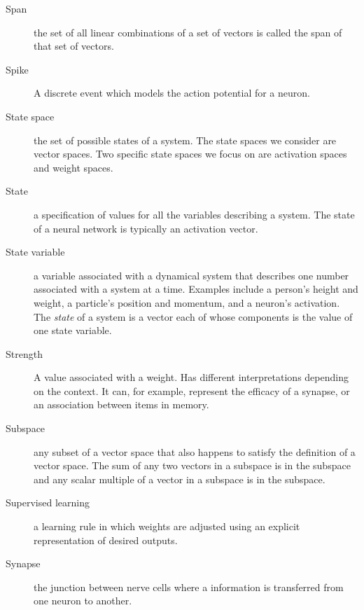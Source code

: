 \begin{description}
\item[Span] the set of all linear combinations of a set of vectors is called the span of that set of vectors.

\item[Spike] A discrete event which models the action potential for a neuron.

\item[State space] the set of possible states of a system. The state spaces we consider are vector spaces. Two specific state spaces we focus on are activation spaces and weight spaces.

\item[State] a specification of values for all the variables describing a system. The state of a neural network is typically an activation vector.

\item[State variable] a variable associated with a dynamical system that describes one number associated with a system at a time. Examples include a person's height and weight, a particle's position and momentum, and a neuron's activation. The \emph{state} of a system is a vector each of whose components is the value of one state variable. 


\item[Strength] A value associated with a weight. Has different interpretations depending on the context. It can, for example, represent the efficacy of a synapse, or an association between items in memory.


\item[Subspace] any subset of a vector space that also happens to satisfy the definition of a vector space. The sum of any two vectors in a subspace is in the subspace and any scalar multiple of a vector in a subspace is in the subspace.

\item[Supervised learning] a learning rule in which weights are adjusted using an explicit representation of desired outputs.


\item[Synapse] the junction between nerve cells where a information is transferred from one neuron to another.


\end{description}

